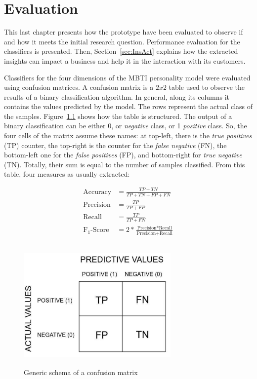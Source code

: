 \chapter{Evaluation}
\label{cha:evaluation}
This last chapter presents how the prototype have been evaluated to observe if and how it meets the initial research question.
Performance evaluation for the classifiers is presented. Then, Section~\ref{sec:InsAct} explains how the extracted insights can impact a business and help it in the interaction with its customers.

Classifiers for the four dimensions of the MBTI personality model were evaluated using confusion matrices.
A confusion matrix is a $2x2$ table used to observe the results of a binary classification algorithm.
In general, along its columns it contains the values predicted by the model. The rows represent the actual class of the samples. Figure~\ref{fig:confMat} shows how the table is structured.
The output of a binary classification can be either 0, or \textit{negative} class, or 1 \textit{positive} class.
So, the four cells of the matrix assume these names: at top-left, there is the \textit{true positives} (TP) counter, the top-right is the counter for the \textit{false negative} (FN), the bottom-left one for the \textit{false positives} (FP), and bottom-right for \textit{true negative} (TN).
Totally, their sum is equal to the number of samples classified.
From this table, four measures as usually extracted: 

\begin{equation*}
\begin{split}
\text{Accuracy} & = \frac{TP + TN}{TP + TN + FP + FN}\\
\text{Precision} & = \frac{TP}{TP + FP} \\ 
\text{Recall} & = \frac{TP}{TP + FN}\\
\text{F}_1\text{-Score} & = 2 * \frac{\text{Precision} * \text{Recall}}{\text{Precision} + \text{Recall}}
\end{split}
\end{equation*}

\begin{figure}
\centering
\includegraphics[width=%
0.7\textwidth,height=6.5cm,keepaspectratio]{img/confMatrix.pdf}
\caption{Generic schema of a confusion matrix}
\label{fig:confMat}
\end{figure}

